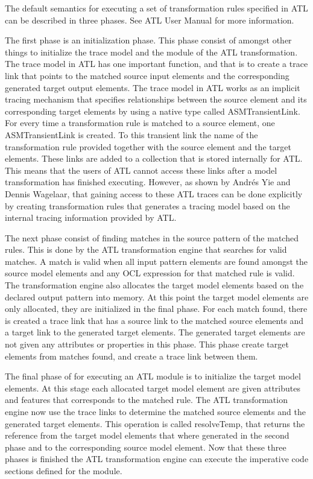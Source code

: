 The default semantics for executing a set of transformation rules specified in
ATL can be described in three phases. See ATL User Manual\cite{ATL_USERMAN} for
more information.

The first phase is an initialization phase. This phase consist of amongst other
things to initialize the trace model and the module of the ATL transformation.
The trace model in ATL has one important function, and that is to create a
trace link that points to the matched source input elements and the
corresponding generated target output elements. The trace model in ATL works as
an implicit tracing mechanism that specifies relationships between the source
element and its corresponding target elements by using a native type called
ASMTransientLink\cite{Wagelaar}. For every time a transformation rule is
matched to a source element, one ASMTransientLink is created. To this transient
link the name of the transformation rule provided together with the source
element and the target elements. These links are added to a collection that is
stored internally for ATL. This means that the users of ATL cannot access these
links after a model transformation has finished executing. However, as shown by
Andr\'{e}s Yie and Dennis Wagelaar\cite{Wagelaar}, that gaining access to these
ATL traces can be done explicitly by creating transformation rules that
generates a tracing model based on the internal tracing information provided by ATL.

The next phase consist of finding matches in the source pattern of the matched
rules. This is done by the ATL transformation engine that searches for valid
matches. A match is valid when all input pattern elements are found amongst
the source model elements and any OCL expression for that matched rule is valid.
The transformation engine also allocates the target model elements based on the
declared output pattern into memory. At this point the target model elements are
only allocated, they are initialized in the final phase. For each match found,
there is created a trace link that has a source link to the matched source
elements and a target link to the generated target elements. The generated
target elements are not given any attributes or properties in this phase. This
phase create target elements from matches found, and create a trace link between
them.

The final phase of for executing an ATL module is to initialize the target model
elements. At this stage each allocated target model element are given
attributes and features that corresponds to the matched rule. The ATL
transformation engine now use the trace links to determine the matched source
elements and the generated target elements. This operation is called
resolveTemp, that returns the reference from the target model elements that
where generated in the second phase and to the corresponding source model
element. Now that these three phases is finished the ATL transformation engine
can execute the imperative code sections defined for the module. 




